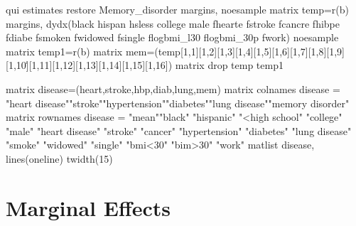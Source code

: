 \documentclass{article}
\begin{document}
\begin{Statacode}
qui estimates restore Memory_disorder
margins, noesample
matrix temp=r(b)
margins, dydx(black hispan hsless college male fhearte fstroke fcancre fhibpe fdiabe fsmoken fwidowed fsingle flogbmi_l30 flogbmi_30p fwork) noesample
matrix temp1=r(b)
matrix mem=(temp[1,1][1,2][1,3][1,4][1,5][1,6][1,7][1,8][1,9][1,10]\.[1,11][1,12][1,13][1,14][1,15][1,16])
matrix drop temp temp1

matrix disease=(heart,stroke,hbp,diab,lung,mem)
matrix colnames disease = "heart disease""stroke""hypertension""diabetes""lung disease""memory disorder"
matrix rownames disease = "mean""black" "hispanic" "<high school" "college" "male" "heart disease" "stroke" "cancer" "hypertension" "diabetes" "lung disease" "smoke" "widowed" "single" "bmi<30" "bim>30" "work"
matlist disease, lines(oneline) twidth(15)  
\end{Statacode}

\pagebreak
\section*{\centering Marginal Effects}
\end{document}
